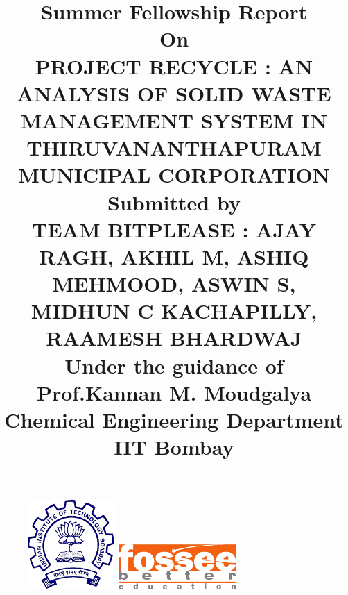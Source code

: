 \documentclass[12pt,a4paper]{report}
\begin{document}
\begin{figure}
	\centering
	\includegraphics[width = 0.3\textwidth]{iit}
	\hspace{1cm}
	\includegraphics[width = 0.4\textwidth]{fossee-logo}
\end{figure}

\title
	{\textbf
			{\textbf
				{Summer Fellowship Report}}
				\vspace{5mm} 
				\\\small On 
				\\\vspace{5mm} 
				\textbf
				{\large PROJECT RECYCLE : AN ANALYSIS OF SOLID WASTE MANAGEMENT SYSTEM IN THIRUVANANTHAPURAM MUNICIPAL CORPORATION}
				\vspace{5mm} 
				\\\vspace{5mm}
				\small Submitted by
				\\\vspace{5mm}  
				\large 
				\textbf
					{TEAM BITPLEASE :}
					\small AJAY RAGH, AKHIL M, ASHIQ MEHMOOD, ASWIN S, MIDHUN C KACHAPILLY, RAAMESH BHARDWAJ	
					\\ \vspace{5mm}
				\small Under the guidance of \\ \vspace{5mm}
				\large 
				\textbf{Prof.Kannan M. Moudgalya} 
				\vspace{1mm}\\ Chemical Engineering Department  \vspace{1mm} \\IIT Bombay
}
\vspace{1cm}


\maketitle
\end{document}
